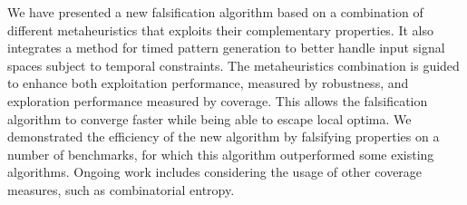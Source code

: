 
We have presented a new falsification algorithm based on a combination of different metaheuristics that exploits their complementary properties. It also integrates a method for timed pattern generation to better handle input signal spaces subject to temporal constraints.
The metaheuristics combination is guided to enhance both exploitation performance, measured by robustness, and exploration performance measured by coverage. This allows the falsification algorithm to converge faster while being able to escape local optima. 
We demonstrated the efficiency of the new algorithm by falsifying
properties on a number of benchmarks, for which this algorithm outperformed some existing algorithms. Ongoing work includes considering the usage of other coverage measures, such as combinatorial entropy. 
